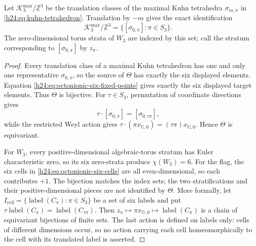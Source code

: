 Let \(\mathscr K_3^{\max}/\mathbb Z^3\) be the translation classes of the maximal
Kuhn tetrahedra \(\sigma_{m,\pi}\) in
\eqref{h24:eq:kuhn-tetrahedron}.  Translation by \(-m\) gives the exact
identification
\[
 \mathscr K_3^{\max}/\mathbb Z^3
 =\{[\sigma_{0,\pi}]:\pi\in S_3\}.
\]
The zero-dimensional torus strata of \(W_3\) are indexed by this set; call
the stratum corresponding to \([\sigma_{0,\pi}]\) by \(z_\pi\).


\begin{proof}
Every translation class of a maximal Kuhn tetrahedron has one and only one
representative \(\sigma_{0,\pi}\), so the source of \(\Theta\) has exactly
the six displayed elements.  Equation
\eqref{h24:eq:octonionic-six-fixed-points} gives exactly the six displayed
target elements.  Thus \(\Theta\) is bijective.  For
\(\tau\in S_3\), permutation of coordinate directions gives
\[
 \tau\cdot[\sigma_{0,\pi}]=[\sigma_{0,\tau\pi}],
\]
while the restricted Weyl action gives
\(\tau\cdot(\pi x_{\mathbb O,0})=(\tau\pi)x_{\mathbb O,0}\).  Hence \(\Theta\) is
equivariant.

For \(W_3\), every positive-dimensional algebraic-torus stratum has Euler
characteristic zero, so its six zero-strata produce \(\chi(W_3)=6\).
For the flag, the six cells in
\eqref{h24:eq:octonionic-six-cells} are all even-dimensional, so each
contributes \(+1\).  The bijection matches the index sets; the two
stratifications and their positive-dimensional pieces are not identified
by \(\Theta\).
More formally, let \(I_{\mathrm{cell}}=\{\operatorname{label}(C_\pi):
\pi\in S_3\}\) be a set of six labels and put
\(\tau\operatorname{label}(C_\pi)=\operatorname{label}(C_{\tau\pi})\).
Then \(z_\pi\mapsto\pi x_{\mathbb O,0}\mapsto
\operatorname{label}(C_\pi)\) is a chain of equivariant bijections of
finite sets.  The last action is defined on labels only: cells of different
dimensions occur, so no action carrying each cell homeomorphically to
the cell with its translated label is asserted.
\end{proof}

